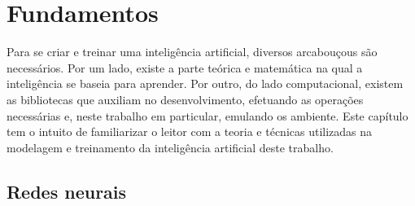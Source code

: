 %




\chapter{Fundamentos}
\label{cap:fundamentos}

Para se criar e treinar uma inteligência artificial, diversos arcabouçous são necessários.
Por um lado, existe a parte teórica e matemática na qual a inteligência se baseia para aprender. 
Por outro, do lado computacional, existem as bibliotecas que auxiliam no desenvolvimento, efetuando as operações necessárias e, neste trabalho em particular, emulando os ambiente.
Este capítulo tem o intuito de familiarizar o leitor com a teoria e técnicas utilizadas na modelagem e treinamento da inteligência artificial deste trabalho.


\section{Redes neurais}
\label{sec:nn}

